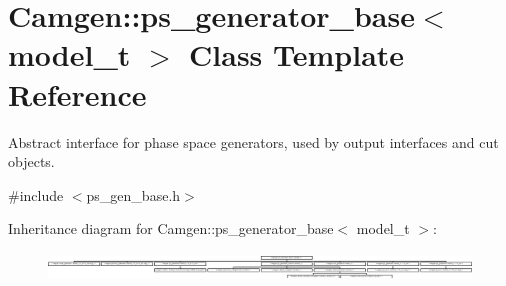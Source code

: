 \hypertarget{a00442}{\section{Camgen\-:\-:ps\-\_\-generator\-\_\-base$<$ model\-\_\-t $>$ Class Template Reference}
\label{a00442}
}


Abstract interface for phase space generators, used by output interfaces and cut objects.  




{\ttfamily \#include $<$ps\-\_\-gen\-\_\-base.\-h$>$}

Inheritance diagram for Camgen\-:\-:ps\-\_\-generator\-\_\-base$<$ model\-\_\-t $>$\-:\begin{figure}[H]
\begin{center}
\leavevmode
\includegraphics[height=0.723514cm]{a00442}
\end{center}
\end{figure}
